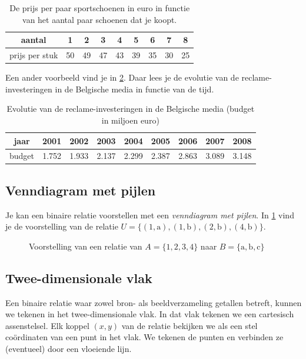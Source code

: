 \begin{table}[htbp]
\centering
\caption{De prijs per paar  sportschoenen in euro in functie van het aantal paar schoenen dat je koopt.}
\begin{tabular}{ccccccccc}
\hline 
aantal & 1 & 2 & 3 & 4 & 5 & 6 & 7 & 8 \\ 
\hline 
prijs per stuk & 50 & 49 & 47 & 43 & 39 & 35 & 30 & 25 \\ 
\hline 
\end{tabular} 
\label{tab:sportschoenen}
\end{table}

Een ander voorbeeld vind je in \cref{tab:reclame}. Daar lees  je de evolutie van de reclame-investeringen in de Belgische media in functie van de tijd.
\begin{table}[htbp]
\centering
\caption{Evolutie van de reclame-investeringen in de Belgische media (budget in miljoen euro)}
\begin{tabular}{ccccccccc}
\toprule
jaar & 2001 & 2002 & 2003 & 2004 & 2005 & 2006 & 2007 & 2008 \\ 
\midrule
budget & \num{1.752} & \num{1.933} & \num{2.137} & \num{2.299} & \num{2.387} & \num{2.863} & \num{3.089} & \num{3.148} \\ 
\bottomrule
\end{tabular} 
\label{tab:reclame}
\end{table}

\subsection{Venndiagram met pijlen}
Je kan een binaire relatie  voorstellen met een \emph{venndiagram met pijlen}. In \cref{fig:grafiek} vind je de voorstelling van de relatie $U=\{(1,\mathrm{a}),(1,\mathrm{b}),(2,\mathrm{b}),(4,\mathrm{b}) \}$. 

\begin{figure}[htbp]
\centering

\caption{Voorstelling van een relatie van $A=\{1,2,3,4\}$ naar $B=\{\mathrm{a},\mathrm{b},\mathrm{c} \}$}
\label{fig:grafiek}
\end{figure}

\subsection{Twee-dimensionale vlak}
Een binaire relatie waar zowel bron- als beeldverzameling getallen betreft, kunnen we tekenen in 
het twee-dimensionale vlak. In dat vlak tekenen we  een cartesisch 
assenstelsel. Elk koppel $(x,y)$ van de relatie bekijken we als een 
stel co\"ordinaten van een punt in het vlak. We tekenen de punten en 
verbinden ze (eventueel) door een vloeiende lijn.

